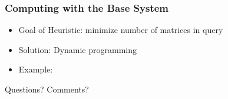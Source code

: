 \documentclass{beamer}
\begin{document}
\begin{frame}
\frametitle{Computing with the Base System}
\begin{itemize}

\item Goal of Heuristic: minimize number of matrices in query

\item Solution: Dynamic programming 

\item Example: 

\end{itemize}
\end{frame}


\begin{frame}
\Huge{\centerline{Questions? Comments?}}
\end{frame}





\end{document}
